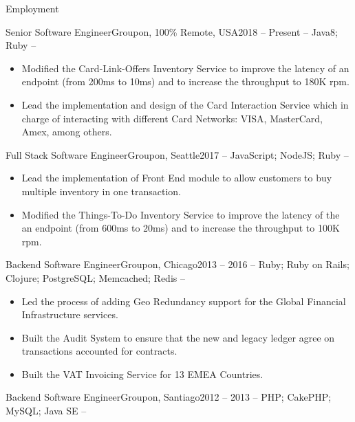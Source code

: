 \documentclass[]{mcdowellcv}
\begin{document}
	\makeheader
	\begin{cvsection}{Employment}
		\begin{cvsubsection}{Senior Software Engineer}{Groupon, 100\% Remote, USA}{2018 -- Present}
			 -- Java8; Ruby --
			\begin{itemize}
			 	\item Modified the Card-Link-Offers Inventory Service to improve the latency of an endpoint (from 200ms to 10ms) and to increase the throughput to 180K rpm.
				\item Lead the implementation and design of the Card Interaction Service which in charge of interacting with different Card Networks: VISA, MasterCard, Amex, among others.
			\end{itemize}
		\end{cvsubsection}
		\begin{cvsubsection}{Full Stack Software Engineer}{Groupon, Seattle}{2017}
			 -- JavaScript; NodeJS; Ruby --
			\begin{itemize}
			 	\item Lead the implementation of Front End module to allow customers to buy multiple inventory in one transaction. 
				\item Modified the Things-To-Do Inventory Service to improve the latency of the an endpoint (from 600ms to 20ms) and to increase the throughput to 100K rpm.
			\end{itemize}
		\end{cvsubsection}
		\begin{cvsubsection}{Backend Software Engineer}{Groupon, Chicago}{2013 -- 2016}
			 -- Ruby; Ruby on Rails; Clojure; PostgreSQL; Memcached; Redis --
			\begin{itemize}
				\item Led the process of adding Geo Redundancy support for the Global Financial Infrastructure services.
				\item Built the Audit System to ensure that the new and legacy ledger agree on transactions accounted for contracts.
				\item Built the VAT Invoicing Service for 13 EMEA Countries.
			\end{itemize}
		\end{cvsubsection}
		\begin{cvsubsection}{Backend Software Engineer}{Groupon, Santiago}{2012 -- 2013}
			 -- PHP; CakePHP; MySQL; Java SE --

\end{cvsubsection}
\end{cvsection}
\end{document}
